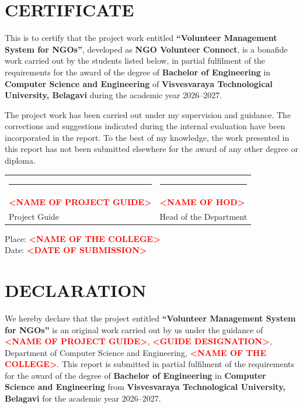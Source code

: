 \documentclass[12pt,a4paper,oneside]{report}
\newcommand{\projecttitle}{Volunteer Management System for NGOs}
\newcommand{\applicationname}{NGO Volunteer Connect}
\newcommand{\college}{\placeholder{NAME OF THE COLLEGE}}
\newcommand{\department}{Department of Computer Science and Engineering}
\newcommand{\university}{Visvesvaraya Technological University, Belagavi}
\newcommand{\academicyear}{2026--2027}
\newcommand{\degree}{Bachelor of Engineering}
\newcommand{\branch}{Computer Science and Engineering}
\newcommand{\guide}{\placeholder{NAME OF PROJECT GUIDE}}
\newcommand{\guideDesignation}{\placeholder{GUIDE DESIGNATION}}
\newcommand{\hod}{\placeholder{NAME OF HOD}}
\newcommand{\placeholder}[1]{\textbf{\textcolor{red}{\textless #1\textgreater}}}
\begin{document}
\chapter*{CERTIFICATE}

This is to certify that the project work entitled \textbf{``\projecttitle''}, developed as \textbf{\applicationname}, is a bonafide work carried out by the students listed below, in partial fulfilment of the requirements for the award of the degree of \textbf{\degree} in \textbf{\branch} of \textbf{\university} during the academic year \academicyear.

The project work has been carried out under my supervision and guidance. The corrections and suggestions indicated during the internal evaluation have been incorporated in the report. To the best of my knowledge, the work presented in this report has not been submitted elsewhere for the award of any other degree or diploma.

\vspace{1.0in}
\noindent
\begin{tabularx}{\textwidth}{
    >{\centering\arraybackslash}X
    >{\centering\arraybackslash}X
}

\rule{2.2in}{0.4pt} &
\rule{2.2in}{0.4pt} \\[0.15cm]

\guide &
\hod \\[0.1cm]

Project Guide &
Head of the Department \\

\end{tabularx}
\vfill
\noindent Place: \college\\
Date: \placeholder{DATE OF SUBMISSION}

\clearpage

\chapter*{DECLARATION}

We hereby declare that the project entitled \textbf{``\projecttitle''} is an original work carried out by us under the guidance of \textbf{\guide}, \guideDesignation, \department, \college. This report is submitted in partial fulfilment of the requirements for the award of the degree of \textbf{\degree} in \textbf{\branch} from \textbf{\university} for the academic year \academicyear.
\end{document}
